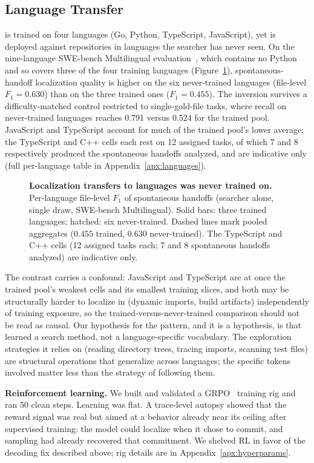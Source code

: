 \subsection{Language Transfer}
\label{sec:language-transfer}

\modelname is trained on four languages (Go, Python, TypeScript, JavaScript),
yet \sysname is deployed against repositories in languages the searcher has
never seen. On the nine-language SWE-bench Multilingual
evaluation~\citep{swebenchmultilingual}, which contains no Python and so
covers three of the four training languages
(Figure~\ref{fig:language-transfer}), spontaneous-handoff localization quality
is higher on the six never-trained languages (file-level $F_1 = 0.630$) than on
the three trained ones ($F_1 = 0.455$). The inversion survives a
difficulty-matched control restricted to single-gold-file tasks, where recall
on never-trained languages reaches 0.791 versus 0.524 for the trained pool.
JavaScript and TypeScript account for much of the trained pool's lower average;
the TypeScript and C++ cells each rest on 12 assigned tasks, of which 7 and 8
respectively produced the spontaneous handoffs analyzed, and are indicative
only (full per-language table in Appendix~\ref{apx:languages}).

\begin{figure}[!tbp]

\caption{\textbf{Localization transfers to languages \modelname was never
trained on.}  Per-language file-level $F_1$ of spontaneous handoffs
(searcher alone, single draw, SWE-bench Multilingual).  Solid bars:
three trained languages; hatched: six never-trained.  Dashed lines mark
pooled aggregates ($0.455$ trained, $0.630$ never-trained).
The TypeScript and C++ cells (12 assigned tasks each; 7 and 8
spontaneous handoffs analyzed) are indicative only.}
\label{fig:language-transfer}
\end{figure}

The contrast carries a confound: JavaScript and TypeScript are at once the
trained pool's weakest cells and its smallest training slices, and both may be
structurally harder to localize in (dynamic imports, build artifacts)
independently of training exposure, so the trained-versus-never-trained
comparison should not be read as causal.
Our hypothesis for the pattern, and it is a hypothesis, is that \modelname
learned a search method, not a language-specific vocabulary. The exploration
strategies it relies on (reading directory trees, tracing imports, scanning
test files) are structural operations that generalize across languages; the
specific tokens involved matter less than the strategy of following them.

\medskip
\noindent\textbf{Reinforcement learning.}\quad
We built and validated a GRPO~\citep{grpo} training rig and ran 50 clean
steps. Learning was flat. A trace-level autopsy showed that the reward signal
was real but aimed at a behavior already near its ceiling after supervised
training: the model could localize when it chose to commit, and sampling had
already recovered that commitment. We shelved RL in favor of the decoding fix
described above; rig details are in Appendix~\ref{apx:hyperparams}.

\FloatBarrier
